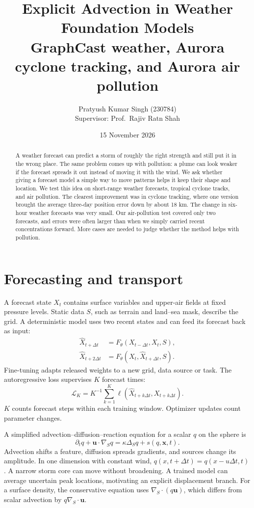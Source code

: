 \documentclass[10pt,a4paper]{article}
\title{\textbf{Explicit Advection in Weather Foundation Models}\\[3pt]\large GraphCast weather, Aurora cyclone tracking, and Aurora air pollution}
\author{Pratyush Kumar Singh (230784)\\[4pt]Supervisor: Prof.\ Rajiv Ratn Shah}
\date{15 November 2026}
\begin{document}
\maketitle
\small
\begin{abstract}
A weather forecast can predict a storm of roughly the right strength and still put it in the wrong place. The same problem comes up with pollution: a plume can look weaker if the forecast spreads it out instead of moving it with the wind. We ask whether giving a forecast model a simple way to move patterns helps it keep their shape and location. We test this idea on short-range weather forecasts, tropical cyclone tracks, and air pollution. The clearest improvement was in cyclone tracking, where one version brought the average three-day position error down by about 18 km. The change in six-hour weather forecasts was very small. Our air-pollution test covered only two forecasts, and errors were often larger than when we simply carried recent concentrations forward. More cases are needed to judge whether the method helps with pollution.
\end{abstract}

\section{Forecasting and transport}
A forecast state \(X_t\) contains surface variables and upper-air fields at fixed pressure levels. Static data \(S\), such as terrain and land--sea mask, describe the grid. A deterministic model uses two recent states and can feed its forecast back as input:
\[
 \begin{aligned}\widehat X_{t+\Delta t}&=F_\theta(X_{t-\Delta t},X_t,S),\\
 \widehat X_{t+2\Delta t}&=F_\theta(X_t,\widehat X_{t+\Delta t},S).\end{aligned}
\]
Fine-tuning adapts released weights to a new grid, data source or task. The autoregressive loss supervises \(K\) forecast times:
\[\mathcal L_K=K^{-1}\sum_{k=1}^K\ell(\widehat X_{t+k\Delta t},X_{t+k\Delta t}).\] \(K\) counts forecast steps within each training window. Optimizer updates count parameter changes.

A simplified advection--diffusion--reaction equation for a scalar \(q\) on the sphere is
\[
 \partial_tq+\boldsymbol u\cdot\nabla_Sq=\kappa\Delta_Sq+s(q,\boldsymbol x,t).
\]
Advection shifts a feature, diffusion spreads gradients, and sources change its amplitude. In one dimension with constant wind, \(q(x,t+\Delta t)=q(x-u\Delta t,t)\). A narrow storm core can move without broadening. A trained model can average uncertain peak locations, motivating an explicit displacement branch. For a surface density, the conservative equation uses \(\nabla_S\cdot(q\boldsymbol u)\), which differs from scalar advection by \(q\nabla_S\cdot\boldsymbol u\).
\end{document}
